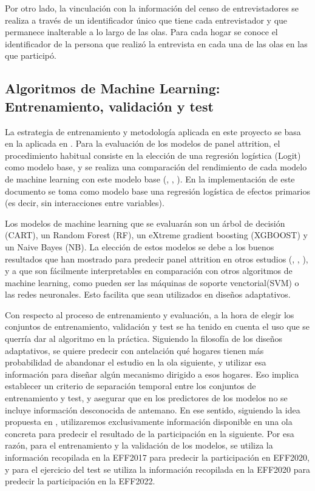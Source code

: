 Por otro lado, la vinculación con la información del censo de entrevistadores se realiza a través de un identificador único que tiene cada entrevistador y que permanece inalterable a lo largo de las olas. Para cada hogar se conoce el identificador de la persona que realizó la entrevista en cada una de las olas en las que participó.

\subsection{Algoritmos de Machine Learning: Entrenamiento, validación y test}

La estrategia de entrenamiento y metodología aplicada en este proyecto se basa en la aplicada en \cite{beste2023case}. Para la evaluación de los modelos de panel attrition, el procedimiento habitual consiste en la elección de una regresión logística (Logit) como modelo base, y se realiza una comparación del rendimiento de cada modelo de machine learning con este modelo base (\cite{lepkowski2002nonresponse}, \cite{kern2021predicting}, \cite{beste2023case}). En la implementación de este documento se toma como modelo base una regresión logística de efectos primarios (es decir, sin interacciones entre variables).

Los modelos de machine learning que se evaluarán son un árbol de decisión (CART), un Random Forest (RF), un eXtreme gradient boosting (XGBOOST) y un Naive Bayes (NB). La elección de estos modelos se debe a los buenos resultados que han mostrado para predecir panel attrition en otros estudios (\cite{kern2019tree}, \cite{kern2021predicting}, \cite{beste2023case}), y a que son fácilmente interpretables en comparación con otros algoritmos de machine learning, como pueden ser las máquinas de soporte venctorial(SVM) o las redes neuronales. Esto facilita que sean utilizados en diseños adaptativos.

Con respecto al proceso de entrenamiento y evaluación, a la hora de elegir los conjuntos de entrenamiento, validación y test se ha tenido en cuenta el uso que se querría dar al algoritmo en la práctica. Siguiendo la filosofía de los diseños adaptativos, se quiere predecir con antelación qué hogares tienen más probabilidad de abandonar el estudio en la ola siguiente, y utilizar esa información para diseñar algún mecanismo dirigido a esos hogares. Eso implica establecer un criterio de separación temporal entre los conjuntos de entrenamiento y test, y asegurar que en los predictores de los modelos no se incluye información desconocida de antemano. En ese sentido, siguiendo la idea propuesta en \cite{beste2023case}, utilizaremos exclusivamente información disponible en una ola concreta para predecir el resultado de la participación en la siguiente. Por esa razón, para el entrenamiento y la validación de los modelos, se utiliza la información recopilada en la EFF2017 para predecir la participación en EFF2020, y para el ejercicio del test se utiliza la información recopilada en la EFF2020 para predecir la participación en la EFF2022.


